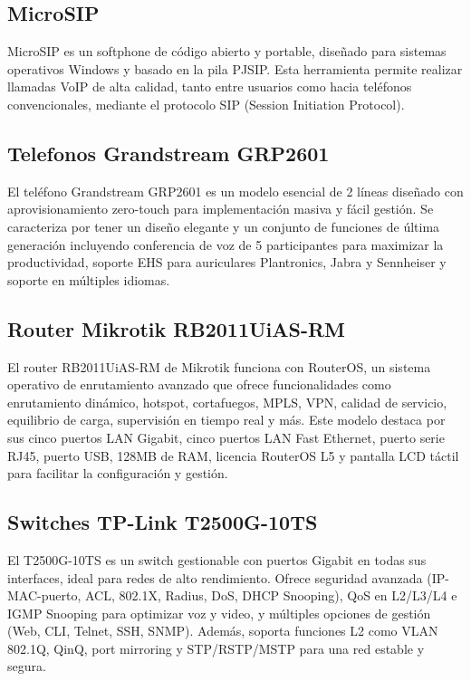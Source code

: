 \subsection{MicroSIP}
MicroSIP \cite{microsip} es un softphone de código abierto y portable, diseñado para sistemas operativos Windows y basado en la pila PJSIP. Esta herramienta permite realizar llamadas VoIP de alta calidad, tanto entre usuarios como hacia teléfonos convencionales, mediante el protocolo SIP (Session Initiation Protocol).

\subsection{Telefonos Grandstream GRP2601}
El teléfono Grandstream GRP2601 \cite{grandstream_grp2601_datasheet} es un modelo esencial de 2 líneas diseñado con aprovisionamiento zero-touch para implementación masiva y fácil gestión. Se caracteriza por tener un diseño elegante y un conjunto de funciones de última generación incluyendo conferencia de voz de 5 participantes para maximizar la productividad, soporte EHS para auriculares Plantronics, Jabra y Sennheiser y soporte en múltiples idiomas.

\subsection{Router Mikrotik RB2011UiAS-RM}
El router RB2011UiAS-RM \cite{mikrotik_rb2011uias_rm} de Mikrotik funciona con RouterOS, un sistema operativo de enrutamiento avanzado que ofrece funcionalidades como enrutamiento dinámico, hotspot, cortafuegos, MPLS, VPN, calidad de servicio, equilibrio de carga, supervisión en tiempo real y más. Este modelo destaca por sus cinco puertos LAN Gigabit, cinco puertos LAN Fast Ethernet, puerto serie RJ45, puerto USB, 128MB de RAM, licencia RouterOS L5 y pantalla LCD táctil para facilitar la configuración y gestión. 

\subsection{Switches TP-Link T2500G-10TS}
El T2500G-10TS \cite{tp_link_t2500g_10ts} es un switch gestionable con puertos Gigabit en todas sus interfaces, ideal para redes de alto rendimiento. Ofrece seguridad avanzada (IP-MAC-puerto, ACL, 802.1X, Radius, DoS, DHCP Snooping), QoS en L2/L3/L4 e IGMP Snooping para optimizar voz y video, y múltiples opciones de gestión (Web, CLI, Telnet, SSH, SNMP). Además, soporta funciones L2 como VLAN 802.1Q, QinQ, port mirroring y STP/RSTP/MSTP para una red estable y segura. 